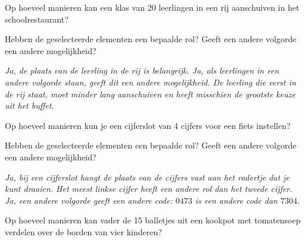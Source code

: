 Op hoeveel manieren kan een klas van 20 leerlingen in een rij aanschuiven in het schoolrestaurant? 

\begin{werktekstoef}
\setcounter{enumi}{4}
\item{Hebben de geselecteerde elementen een bepaalde rol? Geeft een andere volgorde een andere mogelijkheid?}

\emph{Ja, de plaats van de leerling in de rij is belangrijk. Ja, als leerlingen in een andere volgorde staan, geeft dit een andere mogelijkheid. De leerling die eerst in de rij staat, moet minder lang aanschuiven en heeft misschien de grootste keuze uit het buffet.}
\end{werktekstoef}


Op hoeveel manieren kun je een cijferslot van 4 cijfers voor een fiets instellen?

\begin{werktekstoef}
\setcounter{enumi}{4}
\item{Hebben de geselecteerde elementen een bepaalde rol? Geeft een andere volgorde een andere mogelijkheid?}

\emph{Ja, bij een cijferslot hangt de plaats van de cijfers vast aan het radertje dat je kunt draaien. Het meest linkse cijfer heeft een andere rol dan het tweede cijfer. Ja, een andere volgorde geeft een andere code: $0473$ is een andere code dan $7304$.}
\end{werktekstoef}


Op hoeveel manieren kan vader de 15 balletjes uit een kookpot met tomatensoep verdelen over de borden van vier kinderen?

